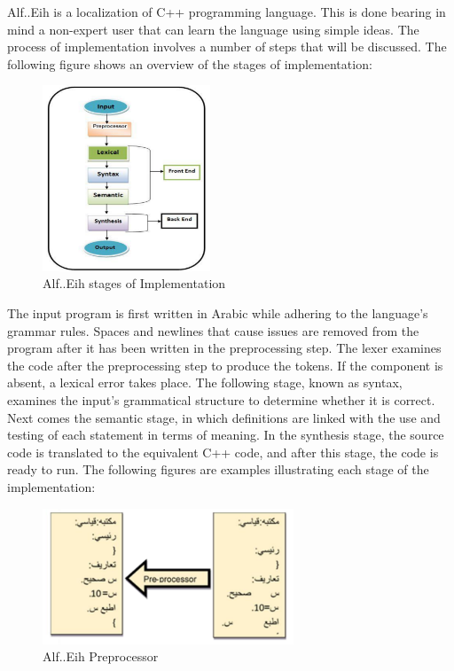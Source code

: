 Alf..Eih is a localization of C++ programming language. This is done bearing in mind a non-expert user that can learn the language using simple ideas. The process of implementation involves a number of steps that will be discussed. The following figure shows an overview of the stages of implementation:

\begin{figure}[H]
\centering
\includegraphics[width=5cm]{ch2-images/AlfEih2.png}
\caption{Alf..Eih stages of Implementation \cite{razaq2019designing}}
\label{fig:Alf..Eih stages of Implementation}
\end{figure}

The input program is first written in Arabic while adhering to the language's grammar rules. Spaces and newlines that cause issues are removed from the program after it has been written in the preprocessing step. The lexer examines the code after the preprocessing step to produce the tokens. If the component is absent, a lexical error takes place. The following stage, known as syntax, examines the input's grammatical structure to determine whether it is correct. Next comes the semantic stage, in which definitions are linked with the use and testing of each statement in terms of meaning. In the synthesis stage, the source code is translated to the equivalent C++ code, and after this stage, the code is ready to run. The following figures are examples illustrating each stage of the implementation:

\begin{figure}[H]
\centering
\includegraphics[width=7.5cm]{ch2-images/AlfEih3.png}
\caption{Alf..Eih Preprocessor \cite{razaq2019designing}}
\label{fig:Alf..Eih Preprocessor}
\end{figure}

